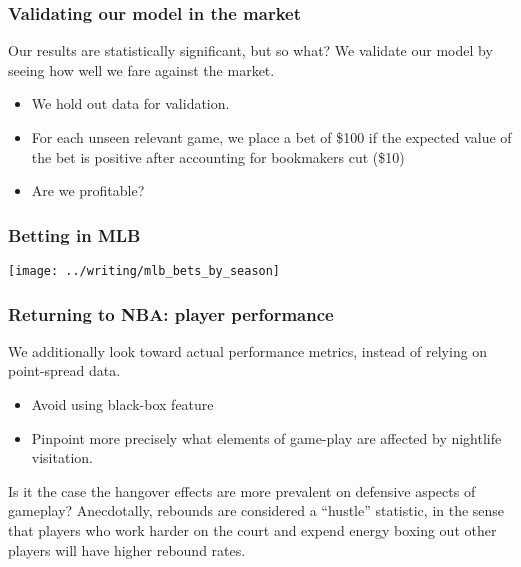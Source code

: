 \documentclass{beamer}
\begin{document}
\begin{frame}   \frametitle{Validating our model in the market}
  Our results are statistically significant, but so what? We validate our model by seeing
  how well we fare against the market.

  \begin{itemize}     \item We hold out data for validation.
    \item For each unseen relevant game, we place a bet of \$100 if the expected value of the bet
      is positive after accounting for bookmakers cut (\$10)
    \item Are we profitable?
  \end{itemize} \end{frame}

\begin{frame}   \frametitle{Betting in MLB}
  \centering
  \texttt{[image: ../writing/mlb\_bets\_by\_season]} \end{frame}

\begin{frame}   \frametitle{Returning to NBA: player performance}
  We additionally look toward actual performance metrics, instead of relying on point-spread data.
  
  \vspace{12pt}
  \begin{itemize}     
    \item Avoid using black-box feature
    \item Pinpoint more precisely what elements of game-play are affected by nightlife visitation.   
\end{itemize}

  \vspace{12pt}  
  \begin{block}{Is it the case the hangover effects are more prevalent on defensive aspects of gameplay?}     Anecdotally, rebounds are considered a ``hustle'' statistic, in the sense that players
    who work harder on the court and expend energy boxing out other players will have higher
    rebound rates.    \end{block}
\end{frame}
\end{document}
